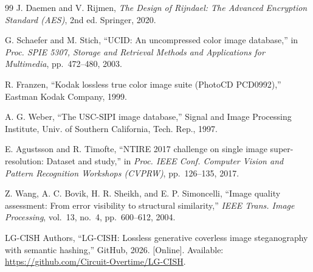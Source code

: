\documentclass[10pt,a4paper]{article}
\theoremstyle{definition}
\begin{document}
\begin{thebibliography}{99}
J. Daemen and V. Rijmen,
\emph{The Design of Rijndael: The Advanced Encryption Standard (AES)}, 2nd ed. Springer, 2020.

G. Schaefer and M. Stich,
``UCID: An uncompressed color image database,''
in \emph{Proc. SPIE 5307, Storage and Retrieval Methods and Applications for Multimedia}, pp.~472--480, 2003.

R. Franzen,
``Kodak lossless true color image suite (PhotoCD PCD0992),''
Eastman Kodak Company, 1999.

A. G. Weber,
``The USC-SIPI image database,''
Signal and Image Processing Institute, Univ. of Southern California, Tech. Rep., 1997.

E. Agustsson and R. Timofte,
``NTIRE 2017 challenge on single image super-resolution: Dataset and study,''
in \emph{Proc. IEEE Conf. Computer Vision and Pattern Recognition Workshops (CVPRW)}, pp.~126--135, 2017.

Z. Wang, A. C. Bovik, H. R. Sheikh, and E. P. Simoncelli,
``Image quality assessment: From error visibility to structural similarity,''
\emph{IEEE Trans. Image Processing}, vol.~13, no.~4, pp.~600--612, 2004.

LG-CISH Authors,
``LG-CISH: Lossless generative coverless image steganography with semantic hashing,''
GitHub, 2026. [Online]. Available:
\url{https://github.com/Circuit-Overtime/LG-CISH}.

\end{thebibliography}
\endgroup
\end{document}
